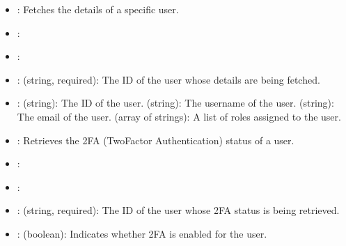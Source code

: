 \documentclass[letterpaper,10pt,english]{sphinxmanual}
\begin{document}
\sphinxAtStartPar
{}
\begin{itemize}
\item {} 
\sphinxAtStartPar
{}: Fetches the details of a specific user.

\item {} 
\sphinxAtStartPar
{}: 

\item {} 
\sphinxAtStartPar
{}: 

\item {} 
\sphinxAtStartPar
{}:
\sphinxhyphen{}  (string, required): The ID of the user whose details are being fetched.

\item {} 
\sphinxAtStartPar
{}:
\sphinxhyphen{}  (string): The ID of the user.
\sphinxhyphen{}  (string): The username of the user.
\sphinxhyphen{}  (string): The email of the user.
\sphinxhyphen{}  (array of strings): A list of roles assigned to the user.

\end{itemize}

\sphinxAtStartPar
{}
\begin{itemize}
\item {} 
\sphinxAtStartPar
{}: Retrieves the 2FA (Two\sphinxhyphen{}Factor Authentication) status of a user.

\item {} 
\sphinxAtStartPar
{}: 

\item {} 
\sphinxAtStartPar
{}: 

\item {} 
\sphinxAtStartPar
{}:
\sphinxhyphen{}  (string, required): The ID of the user whose 2FA status is being retrieved.

\item {} 
\sphinxAtStartPar
{}:
\sphinxhyphen{}  (boolean): Indicates whether 2FA is enabled for the user.

\end{itemize}
\end{document}
